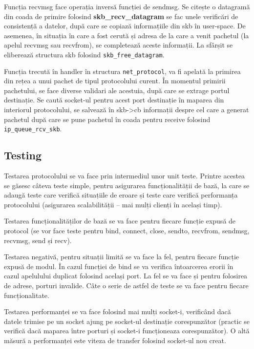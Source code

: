 Funcția recvmsg face operația inversă funcției de sendmsg. Se citește o
datagramă din coada de primire folosind \textbf{skb\_recv\_datagram} se fac
unele verificări de consistență a datelor, după care se copiază informațiile
din skb în user-space. De asemenea, în situația în care a fost cerută și
adresa de la care a venit pachetul (la apelul recvmsg sau recvfrom), se
completează aceste informații. La sfârșit se eliberează structura skb folosind
\texttt{skb\_free\_datagram}.

Funcția trecută în handler în structura \texttt{net\_protocol}, va fi apelată la
primirea din rețea a unui pachet de tipul protocolului curent. În momentul
primirii pachetului, se face diverse validari ale acestuia, după care se
extrage portul destinație. Se caută socket-ul pentru acest port destinație
în maparea din interiorul protocolului, se salvează în skb->cb informații
despre cel care a generat pachetul după care se pune pachetul în coada
pentru receive folosind \texttt{ip\_queue\_rcv\_skb}.

\subsection{Testing}

Testarea protocolului se va face prin intermediul unor unit teste.
Printre acestea se găsesc câteva teste simple, pentru asigurarea
funcționalității de bază, la care se adaugă teste care verifică situațiile de
eroare și teste care verifică performanța protocolului (asigurarea
scalabilității – mai mulți clienți în același timp).

Testarea funcționalităților de bază se va face pentru fiecare funcție
expusă de protocol (se vor face teste pentru bind, connect, close,
sendto, recvfrom, sendmsg, recvmsg, send și recv).

Testarea negativă, pentru situații limită se va face la fel, pentru fiecare
funcție expusă de modul. În cazul funcției de bind se va verifica întoarcerea
erorii în cazul apelulului duplicat folosind același port. La fel se va face
și pentru folosirea de adrese, porturi invalide. Câte o serie de astfel de
teste se va face pentru fiecare funcționalitate.

Testarea performanței se va face folosind mai mulți socket-i,
verificând dacă datele trimise pe un socket ajung pe socket-ul destinație
corespunzător (practic se verifică dacă maparea între porturi și socket-i
funcționeaza corespunzător). O altă măsură a performanței este viteza de
transfer folosind socket-ul nou creat.

